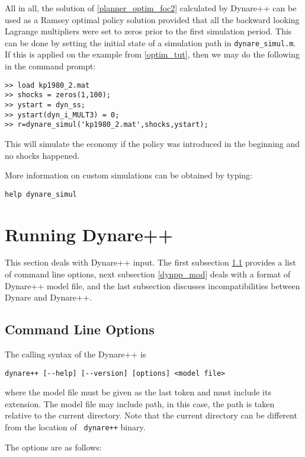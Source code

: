 \documentclass[10pt]{article}
\begin{document}
All in all, the solution of \eqref{planner_optim_foc2} calculated by
Dynare++ can be used as a Ramsey optimal policy solution provided that
all the backward looking Lagrange multipliers were set to zeros prior
to the first simulation period. This can be done by setting the
initial state of a simulation path in {\tt dynare\_simul.m}. If this
is applied on the example from \ref{optim_tut}, then we may do the
following in the command prompt:
{\small
\begin{verbatim}
>> load kp1980_2.mat
>> shocks = zeros(1,100);
>> ystart = dyn_ss;
>> ystart(dyn_i_MULT3) = 0;
>> r=dynare_simul('kp1980_2.mat',shocks,ystart);
\end{verbatim}
}
This will simulate the economy if the policy was introduced in the
beginning and no shocks happened.

More information on custom simulations can be obtained by typing:
{\small
\begin{verbatim}
help dynare_simul
\end{verbatim}
}


\section{Running Dynare++}

This section deals with Dynare++ input. The first subsection
\ref{dynpp_opts} provides a list of command line options, next
subsection \ref{dynpp_mod} deals with a format of Dynare++ model file,
and the last subsection discusses incompatibilities between Dynare
and Dynare++.

\subsection{Command Line Options}
\label{dynpp_opts}

The calling syntax of the Dynare++ is

{\small
\begin{verbatim}
dynare++ [--help] [--version] [options] <model file>
\end{verbatim}
}

\noindent where the model file must be given as the last token and
must include its extension. The model file may include path, in this
case, the path is taken relative to the current directory. Note that
the current directory can be different from the location of {\tt
dynare++} binary.

The options are as follows:

\def\desc#1{\rlap{#1}\kern4cm}
\end{document}

